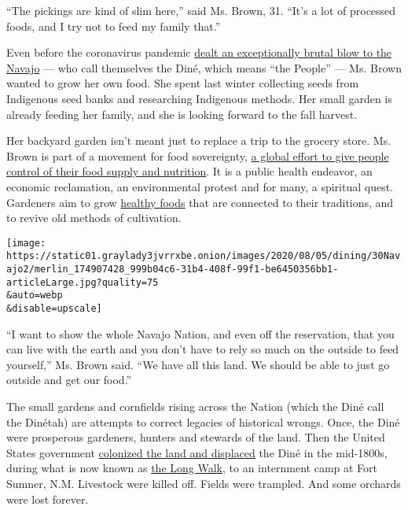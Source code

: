 ``The pickings are kind of slim here,'' said Ms. Brown, 31. ``It's a lot
of processed foods, and I try not to feed my family that.''

Even before the coronavirus pandemic
\href{https://www.nytimes3xbfgragh.onion/2020/05/11/us/coronavirus-native-americans-indian-country.html}{dealt
an exceptionally brutal blow to the Navajo} --- who call themselves the
Diné, which means ``the People'' --- Ms. Brown wanted to grow her own
food. She spent last winter collecting seeds from Indigenous seed banks
and researching Indigenous methods. Her small garden is already feeding
her family, and she is looking forward to the fall harvest.

Her backyard garden isn't meant just to replace a trip to the grocery
store. Ms. Brown is part of a movement for food sovereignty,
\href{https://foodsecurecanada.org/who-we-are/what-food-sovereignty}{a
global effort to give people control of their food supply and
nutrition}. It is a public health endeavor, an economic reclamation, an
environmental protest and for many, a spiritual quest. Gardeners aim to
grow
\href{https://www.nytimes3xbfgragh.onion/2020/04/13/dining/native-americans-coronavirus.html}{healthy
foods} that are connected to their traditions, and to revive old methods
of cultivation.

\texttt{[image: https://static01.graylady3jvrrxbe.onion/images/2020/08/05/dining/30Navajo2/merlin\_174907428\_999b04c6-31b4-408f-99f1-be6450356bb1-articleLarge.jpg?quality=75\\\&auto=webp\\\&disable=upscale]}

``I want to show the whole Navajo Nation, and even off the reservation,
that you can live with the earth and you don't have to rely so much on
the outside to feed yourself,'' Ms. Brown said. ``We have all this land.
We should be able to just go outside and get our food.''

The small gardens and cornfields rising across the Nation (which the
Diné call the Dinétah) are attempts to correct legacies of historical
wrongs. Once, the Diné were prosperous gardeners, hunters and stewards
of the land. Then the United States government
\href{https://www.nytimes3xbfgragh.onion/2020/05/13/opinion/sunday/navajo-nation-coronavirus.html}{colonized
the land and displaced} the Diné in the mid-1800s, during what is now
known as
\href{https://americanindian.si.edu/nk360/navajo/long-walk/long-walk.cshtml}{the
Long Walk}, to an internment camp at Fort Sumner, N.M. Livestock were
killed off. Fields were trampled. And some orchards were lost forever.


